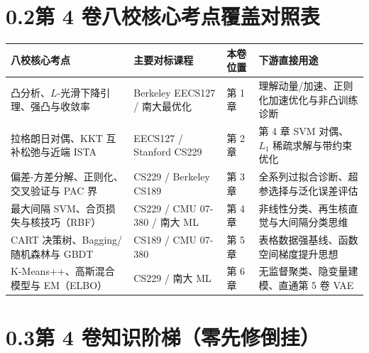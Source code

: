 \section*{0.2\quad 第 4 卷八校核心考点覆盖对照表}

\begin{center}
\footnotesize
\begin{tabularx}{\linewidth}{@{}p{34mm}p{34mm}p{16mm}X@{}}
\toprule
\textbf{八校核心考点} & \textbf{主要对标课程} & \textbf{本卷位置} & \textbf{下游直接用途} \\
\midrule
凸分析、$L$-光滑下降引理、强凸与收敛率 & Berkeley EECS127 / 南大最优化 & 第 1 章 & 理解动量/加速、正则化加速优化与非凸训练诊断 \\
拉格朗日对偶、KKT 互补松弛与近端 ISTA & EECS127 / Stanford CS229 & 第 2 章 & 第 4 章 SVM 对偶、$L_1$ 稀疏求解与带约束优化 \\
偏差-方差分解、正则化、交叉验证与 PAC 界 & CS229 / Berkeley CS189 & 第 3 章 & 全系列过拟合诊断、超参选择与泛化误差评估 \\
最大间隔 SVM、合页损失与核技巧（RBF） & CS229 / CMU 07-380 / 南大 ML & 第 4 章 & 非线性分类、再生核直觉与大间隔分类思维 \\
CART 决策树、Bagging/随机森林与 GBDT & CS189 / CMU 07-380 & 第 5 章 & 表格数据强基线、函数空间梯度提升思想 \\
K-Means++、高斯混合模型与 EM（ELBO） & CS229 / 南大 ML & 第 6 章 & 无监督聚类、隐变量建模、直通第 5 卷 VAE \\
\bottomrule
\end{tabularx}
\end{center}

\section*{0.3\quad 第 4 卷知识阶梯（零先修倒挂）}

